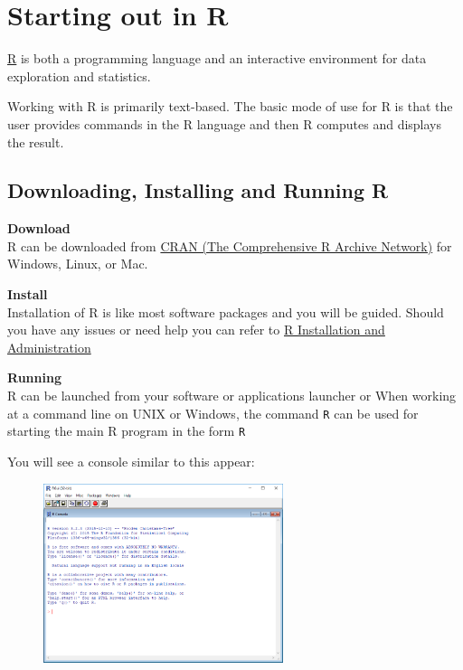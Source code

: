 \documentclass[
  letterpaper,
  DIV=11,
  numbers=noendperiod]{scrreprt}
\begin{document}
\hypertarget{starting-out-in-r}{%
\section{Starting out in R}\label{starting-out-in-r}}

\href{https://cran.rstudio.com/}{R} is both a programming language and
an interactive environment for data exploration and statistics.

Working with R is primarily text-based. The basic mode of use for R is
that the user provides commands in the R language and then R computes
and displays the result.

\hypertarget{downloading-installing-and-running-r}{%
\subsection{Downloading, Installing and Running
R}\label{downloading-installing-and-running-r}}

\textbf{Download}\\
R can be downloaded from \href{https://cran.rstudio.com/index.html}{CRAN
(The Comprehensive R Archive Network)} for Windows, Linux, or Mac.

\textbf{Install}\\
Installation of R is like most software packages and you will be guided.
Should you have any issues or need help you can refer to
\href{https://cran.r-project.org/doc/manuals/r-release/R-admin.html}{R
Installation and Administration}

\textbf{Running}\\
R can be launched from your software or applications launcher or When
working at a command line on UNIX or Windows, the command \texttt{R} can
be used for starting the main R program in the form \texttt{R}

You will see a console similar to this appear:

\begin{figure}

{\centering \includegraphics[width=2.76in,height=\textheight]{./images/console.png}

}

\end{figure}
\end{document}
